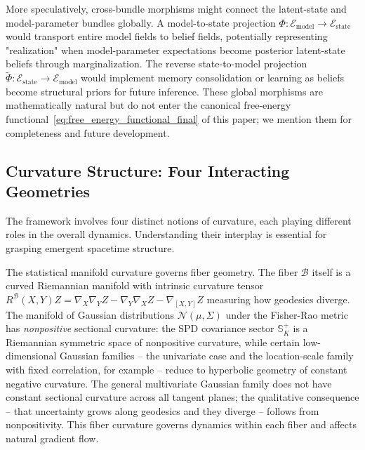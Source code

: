 \documentclass[11pt]{article}
\begin{document}
More speculatively, cross-bundle morphisms might connect the latent-state and model-parameter bundles globally. A model-to-state projection $\Phi: \mathcal{E}_{\mathrm{model}} \to \mathcal{E}_{\mathrm{state}}$ would transport entire model fields to belief fields, potentially representing "realization" when model-parameter expectations become posterior latent-state beliefs through marginalization. The reverse state-to-model projection $\tilde{\Phi}: \mathcal{E}_{\mathrm{state}} \to \mathcal{E}_{\mathrm{model}}$ would implement memory consolidation or learning as beliefs become structural priors for future inference. These global morphisms are mathematically natural but do not enter the canonical free-energy functional~\eqref{eq:free_energy_functional_final} of this paper; we mention them for completeness and future development.

\subsection{Curvature Structure: Four Interacting Geometries}

The framework involves four distinct notions of curvature, each playing different roles in the overall dynamics. Understanding their interplay is essential for grasping emergent spacetime structure.

The statistical manifold curvature governs fiber geometry. The fiber $\mathcal{B}$ itself is a curved Riemannian manifold with intrinsic curvature tensor $R^\mathcal{B}(X,Y)Z = \nabla_X \nabla_Y Z - \nabla_Y \nabla_X Z - \nabla_{[X,Y]} Z$ measuring how geodesics diverge. The manifold of Gaussian distributions $\mathcal{N}(\mu, \Sigma)$ under the Fisher-Rao metric has \emph{nonpositive} sectional curvature: the SPD covariance sector $\mathbb{S}^+_K$ is a Riemannian symmetric space of nonpositive curvature, while certain low-dimensional Gaussian families -- the univariate case and the location-scale family with fixed correlation, for example -- reduce to hyperbolic geometry of constant negative curvature. The general multivariate Gaussian family does not have constant sectional curvature across all tangent planes; the qualitative consequence -- that uncertainty grows along geodesics and they diverge -- follows from nonpositivity. This fiber curvature governs dynamics within each fiber and affects natural gradient flow.
\end{document}
